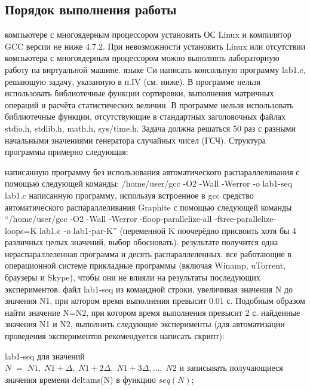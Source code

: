 { %
	\subsection{Порядок выполнения работы}
	\begin{enumerate}
		 компьютере с многоядерным процессором установить ОС Linux и компилятор GCC версии не ниже 4.7.2. При невозможности установить Linux или отсутствии компьютера с многоядерным процессором можно выполнять лабораторную работу на виртуальной машине.
		 языке Cи написать консольную программу lab1.c, решающую задачу, указанную в п.IV (см. ниже). В программе нельзя использовать библиотечные функции сортировки, выполнения матричных операций и расчёта статистических величин.  В программе
нельзя использовать библиотечные функции, отсутствующие в стандартных заголовочных файлах stdio.h, stdlib.h, math.h, sys/time.h. Задача должна решаться 50 раз с разными начальными значениями генератора случайных чисел (ГСЧ).  Структура программы примерно следующая:
			\begin{figure}[H]
				
			\end{figure}
		 написанную программу без использования автоматического распараллеливания с помощью следующей команды: /home/user/gcc -O2 -Wall -Werror -o lab1-seq lab1.c
		 написанную программу, используя встроенное в gcc средство автоматического распараллеливания Graphite с помощью следующей команды “/home/user/gcc -O2 -Wall -Werror -floop-parallelize-all -ftree-parallelize-loops=K lab1.c -o lab1-par-K” (переменной K поочерёдно присвоить хотя бы 4 различных целых значений, выбор обосновать).
		 результате получится одна нераспараллеленная программа и десять распараллеленных.
		 все работающие в операционной системе прикладные программы (включая Winamp, uTorrent, браузеры и Skype), чтобы они не влияли на результаты последующих экспериментов.
		 файл lab1-seq из командной строки, увеличивая значения N до значения N1, при котором время выполнения превысит 0.01 с. Подобным образом найти значение N=N2, при котором время выполнения превысит 2 с.
		 найденные значения N1 и N2, выполнить следующие эксперименты (для автоматизации проведения экспериментов рекомендуется написать скрипт):
			\begin{itemize}
				 lab1-seq для значений \\$N\;=\;{N1,\;N1+\Delta,\;N1+2\Delta,\;N1+3\Delta,…,\;N2}$ и записывать получающиеся значения времени delta\textunderscore ms(N) в функцию $seq(N)$;

\end{itemize}
\end{enumerate}}
